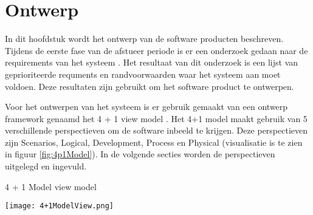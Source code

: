 \chapter{Ontwerp}
In dit hoofdstuk wordt het ontwerp van de software producten beschreven.
Tijdens de eerste fase van de afstueer periode is er een onderzoek gedaan naar de requirements van het systeem \parencite{DanteOnderzoek}.
Het resultaat van dit onderzoek is een lijst van geprioriteerde requments en randvoorwaarden waar het systeem aan moet voldoen.
Deze resultaten zijn gebruikt om het software product te ontwerpen.

\whitespace
Voor het ontwerpen van het systeem is er gebruik gemaakt van een ontwerp framework genaamd het 4 + 1 view model \parencite{4+1ViewModelPaper}.
Het 4+1 model maakt gebruik van 5 verschillende perspectieven om de software inbeeld te krijgen.
Deze perspectieven zijn Scenarios, Logical, Development, Process en Physical (visualisatie is te zien in figuur \ref{fig:4p1Model}).
In de volgende secties worden de perspectieven uitgelegd en ingevuld. 

\whitespace[2]
\begin{graphic}
	\captionsetup{type=figure}
    \caption{4 + 1 Model view model \parencite{4+1ViewModelPaper}}
	\texttt{[image: 4+1ModelView.png]}
	\label{fig:4p1Model}
\end{graphic}

\newpage

\newpage




